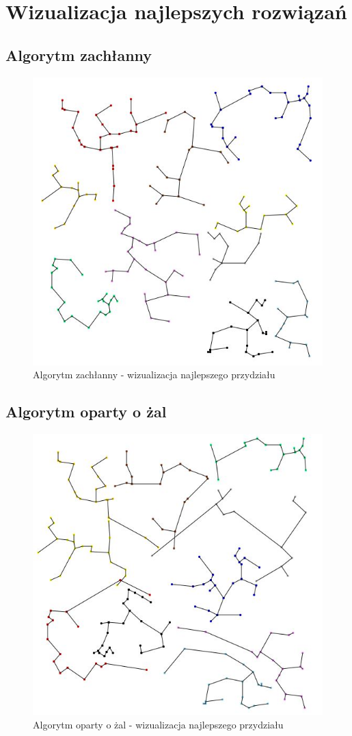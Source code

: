 \documentclass{mwart}
\begin{document}
\section{Wizualizacja najlepszych rozwiązań}
\subsection{Algorytm zachłanny}
\begin{figure}[H]
    \centering
    \includegraphics[width=\textwidth]{zachlanny2.png}
    \caption{Algorytm zachłanny - wizualizacja najlepszego przydziału}
\end{figure}

\subsection{Algorytm oparty o żal}
\begin{figure}[H]
    \centering
    \includegraphics[width=\textwidth]{regret2.png}
    \caption{Algorytm oparty o żal - wizualizacja najlepszego przydziału}
\end{figure}
\end{document}
